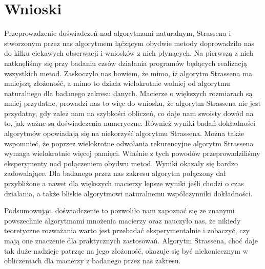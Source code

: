 \section{Wnioski}
Przeprowadzenie doświadczeń nad algorytmami naturalnym, Strassena i stworzonym
przez nas algorytmem łąćzącym obydwie metody doprowadziło nas do kilku ciekawych obserwacji
i wniosków z nich płynących. Na pierwszą z nich natknęliśmy się przy badaniu czsów działania
programów będących realizacją wszystkich metod. Zaskoczyło nas bowiem, że mimo, iż
algorytm Strassena ma mniejszą złożoność, a mimo to działa wielokrotnie wolniej od algorytmu
naturalnego dla badanego zakresu danych. Macierze o większych rozmiarach są mniej przydatne,
prowadzi nas to więc do wniosku, że algorytm Strassena nie jest przydatny, gdy zależ nam
na szybkości obliczeń, co daje nam swoisty dowód na to, jak ważne są doświadczenia numeryczne.
Również wyniki badań dokładności algorytmów opowiadają się na niekorzyść algorytmu Strassena.
Można także wspomnieć, że poprzez wielokrotne odwołania rekurencyjne algorytm Strassena
wymaga wielokrotnie więcej pamięci. Właśnie z tych powodów przeprowadziliśmy eksperymenty nad połączeniem
obydwu metod. Wyniki okazały się bardzo zadowalające. Dla badanego przez nas zakresu algorytm połączony dał przybliżone
a nawet dla większych macierzy lepsze wyniki jeśli chodzi o czas działania, a także bliskie algorytmowi
naturalnemu współczynniki dokładności.

Podsumowując, doświadczenie to pozwoliło nam zapoznać się ze znanymi powszechnie algorytmami
mnożenia macierzy oraz nauczyło nas, że nikiedy teoretyczne rozważania warto jest przebadać
eksperymentalnie i zobaczyć, czy mają one znaczenie dla praktycznych zastosowań. Algorytm Strassena,
choć daje tak duże nadzieje patrząc na jego złożoność, okazuje się być niekoniecznym w obliczeniach dla
macierzy z badanego przez nas zakresu.
